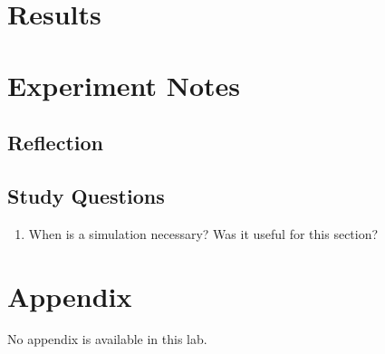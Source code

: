 \documentclass[12pt]{article}
\begin{document}
\section{Results}

\section{Experiment Notes}

\subsection*{Reflection}

\subsection*{Study Questions}

\begin{enumerate}
  \item When is a simulation necessary? Was it useful for this section?
\end{enumerate}

\section*{Appendix}

No appendix is available in this lab.



\end{document}
